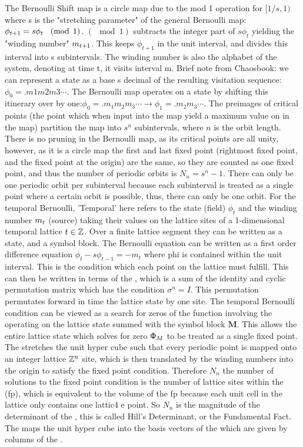 \begin{description}
The Bernoulli Shift map is a circle map due to the mod 1
operation for $[1/s,1)$ where s is the "stretching parameter" of the
general Bernoulli map: $\phi_{t+1}=s\phi_t \hspace{3mm} (\mod
\hspace{1mm}1)$. $(\mod 1)$ subtracts the integer part of $s\phi_t$ yielding
the "winding number" $\Ssym{\zeit+1}$. This keeps $\phi_{t+1}$ in the unit
interval, and divides this interval into s subintervals. The winding
number is also the alphabet of the system, denoting at time t, it visits
interval m. Brief note from Chaosbook: we can represent a state as a base
s decimal of the resulting visitation sequence: $\phi_0=.m1m2m3\cdots$.
The Bernoulli map operates on a state by shifting this itinerary over by
one:$\phi_0=.m_1m_2m_3\cdots\rightarrow\phi_1=.m_2m_3\cdots$. The
preimages of critical points (the point which when input into the map
yield a maximum value on in the map) partition the map into $s^n$
subintervals, where $n$ is the orbit length. There is no pruning in the
Bernoulli map, as its critical points are all unity, however, as it is a
circle map the first and last fixed point (rightmost fixed point, and the
fixed point at the origin) are the same, so they are counted as one fixed
point, and thus the number of periodic orbits is $N_n=s^n-1$. There can
only be one periodic orbit per subinterval because each subinterval is
treated as a single point where a certain orbit is possible, thus, there
can only be one orbit. For the temporal Bernoulli, 'Temporal' here refers
to the state (field) $\phi_t$ and the winding number $\Ssym{\zeit}$ (source)
taking their values on the lattice sites of a 1-dimensional temporal
lattice $\zeit\in\integers$. Over a finite lattice segment they can be
written as a state, and a symbol block. The Bernoulli equation can be
written as a first order difference equation $\phi_t-s\phi_{t-1}=-m_t$
where phi is contained within the unit interval. This is the condition
which each point on the lattice must fulfill. This can then be written in
terms of the {\jacobianOrb}, which is a sum of the identity
and cyclic permutation matrix which has the condition $\sigma^{n}=I$.
This permutation permutates forward in time the lattice state by one
site. The temporal Bernoulli condition can be viewed as a search for
zeros of the function involving the {\jacobianOrb} operating on the
lattice state summed with the symbol block $\mathbf{M}$. This allows the
entire lattice state which solves for zero $\Xx_M$ to be treated as a
single fixed point. The {\jacobianOrb} stretches the unit hyper cube such
that every periodic point is mapped onto an integer lattice $\integers^n$
site, which is then translated by the winding numbers into the origin to
satisfy the fixed point condition. Therefore $N_n$ the number of
solutions to the fixed point condition is the number of lattice sites
within the {\fundPip} (fp), which is equivalent to the
volume of the fp because each unit cell in the lattice only contains one
lattic4 e point. So $N_n$ is the magnitude of the determinant of the
{\jacobianOrb}, this is called Hill's Determinant, or the Fundamental
Fact. The {\jacobianOrb} maps the unit hyper cube into the basis vectors
of the {\fundPip} which are given by columns of the {\jacobianOrb}.



\end{description}
